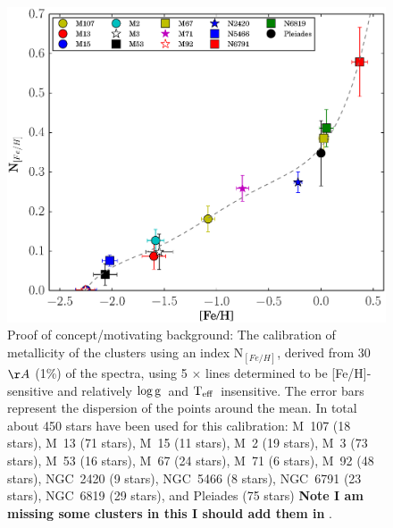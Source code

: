 \documentclass[12pt, preprint]{aastex}
\newcommand{\teff}{\mbox{$\rm T_{eff}$}}
\newcommand{\logg}{\mbox{$\rm \log g$}}
\begin{document}
\begin{figure}[h!]
  \includegraphics[width=\hsize]{./plots/metals_index.eps}
\caption{Proof of concept/motivating background: The calibration of metallicity of the clusters using an index N$_{[Fe/H]}$, derived from 30 $\AA$ (1\%) of the spectra, using 5 $\times$ lines determined to be [Fe/H]-sensitive and relatively \logg\ and \teff\ insensitive. The error bars represent the dispersion of the points
  around the mean. In total about 450  stars have been used for this
  calibration: M~107 (18 stars), M~13 (71 stars), M~15 (11 stars), M~2
  (19 stars), M~3 (73 stars), M~53 (16 stars), M~67 (24 stars), M~71
  (6 stars), M~92 (48 stars), NGC~2420 (9 stars), NGC~5466 (8 stars),
  NGC~6791 (23 stars), NGC~6819 (29 stars), and Pleiades (75 stars)  \textbf{Note I am missing some clusters in this I should add them in} .}
\label{fig:index}
\end{figure}
\end{document}
